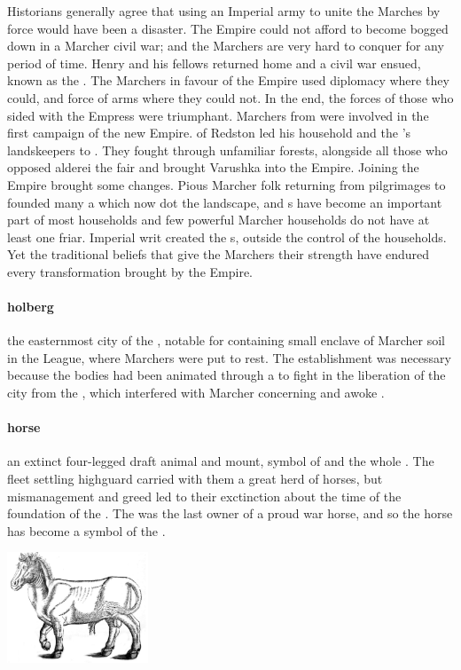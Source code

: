 Historians generally agree that using an Imperial army to unite the Marches by force would have been a disaster. The Empire could not afford to become bogged down in a Marcher civil war; and the Marchers are very hard to conquer for any period of time.
Henry and his fellows returned home and a civil war ensued, known as the . The Marchers in favour of the Empire used diplomacy where they could, and force of arms where they could not. In the end, the forces of those who sided with the Empress were triumphant.
\localpar
{}
Marchers from  were involved in the first campaign of the new Empire.  of Redston led his household and the 's landskeepers to . They fought through unfamiliar forests, alongside all those who opposed alderei the fair and brought Varushka into the Empire.
Joining the Empire brought some changes. Pious Marcher folk returning from pilgrimages to  founded many a  which now dot the landscape, and s have become an important part of most households and few powerful Marcher households do not have at least one friar. Imperial writ created the s, outside the control of the households. Yet the traditional beliefs that give the Marchers their strength have endured every transformation brought by the Empire. 
\paragraph{holberg} the easternmost city of the , notable for containing small enclave of Marcher soil in the League, where Marchers were put to rest. The establishment was necessary because the bodies had been animated through a   to fight in the liberation of the city from the , which interfered with Marcher  concerning  and awoke .
\paragraph{horse} an extinct four-legged draft animal and mount, symbol of  and the whole . The fleet settling highguard carried with them a great herd of horses, but mismanagement and greed led to their exctinction about the time of the foundation of the . The  was the last owner of a proud war horse, and so the horse has become a symbol of the .\begin{center}\includegraphics[width=4.2cm]{encyclopedia/Horse}\end{center}
